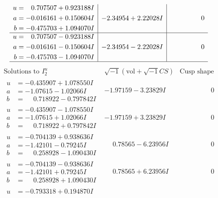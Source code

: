 \documentclass[1p]{elsarticle_modified}
\theoremstyle{definition}
\newcommand{\I}{\sqrt{-1}}
\begin{document}
$$\begin{array}{c|c|c}
\begin{aligned}
u &= \phantom{-}0.707507 + 0.923188 I \\
a &= -0.016161 + 0.150604 I \\
b &= -0.475703 + 1.094070 I\end{aligned}
 & -2.34954 + 2.22028 I & \phantom{-0.000000 } 0 \\ \hline\begin{aligned}
u &= \phantom{-}0.707507 - 0.923188 I \\
a &= -0.016161 - 0.150604 I \\
b &= -0.475703 - 1.094070 I\end{aligned}
 & -2.34954 - 2.22028 I & \phantom{-0.000000 } 0\\
 \hline 
 \end{array}$$\newpage$$\begin{array}{c|c|c}  
\text{Solutions to }I^u_{2}& \I (\text{vol} + \sqrt{-1}CS) & \text{Cusp shape}\\
 \hline 
\begin{aligned}
u &= -0.435907 + 1.078550 I \\
a &= -1.07615 - 1.02066 I \\
b &= \phantom{-}0.718922 - 0.797842 I\end{aligned}
 & -1.97159 - 3.23829 I & \phantom{-0.000000 } 0 \\ \hline\begin{aligned}
u &= -0.435907 - 1.078550 I \\
a &= -1.07615 + 1.02066 I \\
b &= \phantom{-}0.718922 + 0.797842 I\end{aligned}
 & -1.97159 + 3.23829 I & \phantom{-0.000000 } 0 \\ \hline\begin{aligned}
u &= -0.704139 + 0.938636 I \\
a &= -1.42101 - 0.79245 I \\
b &= \phantom{-}0.258928 - 1.090430 I\end{aligned}
 & \phantom{-}0.78565 - 6.23956 I & \phantom{-0.000000 } 0 \\ \hline\begin{aligned}
u &= -0.704139 - 0.938636 I \\
a &= -1.42101 + 0.79245 I \\
b &= \phantom{-}0.258928 + 1.090430 I\end{aligned}
 & \phantom{-}0.78565 + 6.23956 I & \phantom{-0.000000 } 0 \\ \hline\begin{aligned}
u &= -0.793318 + 0.194870 I \\

\end{aligned}
\end{array}$$
\end{document}
